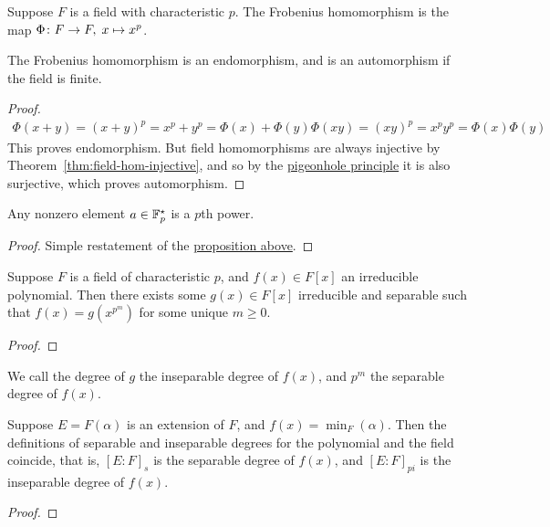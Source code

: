\begin{definition}
    Suppose \(F\) is a field with characteristic \(p\).
    The Frobenius homomorphism is the map \(\Phi\colon F\to F,\;x\mapsto x^p\).
\end{definition}
\begin{proposition}\label{prop:frobenius-hom}
    The Frobenius homomorphism is an endomorphism,
    and is an automorphism if the field is finite.
\end{proposition}
\begin{proof}
    \begin{gather*}
        \Phi(x+y) = {(x+y)}^p = x^p + y^p = \Phi(x) + \Phi(y)
        \Phi(xy) = {(xy)}^p = x^p y^p = \Phi(x)\Phi(y)
    \end{gather*}
    This proves endomorphism.
    But field homomorphisms are always injective
    by Theorem~\ref{thm:field-hom-injective},
    and so by the \hyperref[thm:pigeonhole]{pigeonhole principle}
    it is also surjective,
    which proves automorphism.
\end{proof}
\begin{corollary}
    Any nonzero element \(a \in \mathbb{F}_p^\star\) is a \(p\)th power.
\end{corollary}
\begin{proof}
    Simple restatement of the \hyperref[prop:frobenius-hom]{proposition above}.
\end{proof}

\begin{proposition}\label{prop:separable-power-polynomial}
    Suppose \(F\) is a field of characteristic \(p\),
    and \(f(x) \in F[x]\) an irreducible polynomial.
    Then there exists some \(g(x) \in F[x]\) irreducible and separable
    such that \(f(x) = g(x^{p^m})\) for some unique \(m \geq 0\).
\end{proposition}
\begin{proof}
\end{proof}
\begin{definition}
    We call the degree of \(g\) the inseparable degree of \(f(x)\),
    and \(p^m\) the separable degree of \(f(x)\).
\end{definition}
\begin{proposition}
    Suppose \(E = F(\alpha)\) is an extension of \(F\),
    and \(f(x) = \min_F(\alpha)\).
    Then the definitions of separable and inseparable degrees
    for the polynomial and the field coincide,
    that is, \({[E:F]}_s\) is the separable degree of \(f(x)\),
    and \({[E:F]}_{pi}\) is the inseparable degree of \(f(x)\).
\end{proposition}
\begin{proof}
\end{proof}

